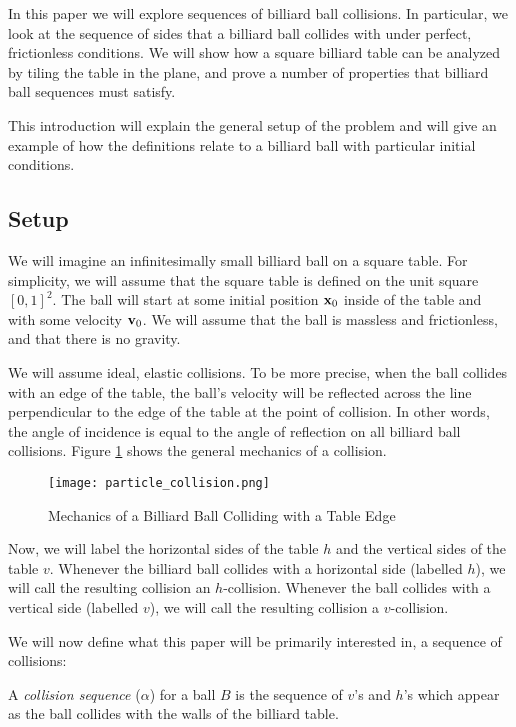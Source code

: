 In this paper we will explore sequences of billiard ball collisions. In particular, we look at the sequence of sides that a billiard ball collides with under perfect, frictionless conditions. We will show how a square billiard table can be analyzed by tiling the table in the plane, and prove a number of properties that billiard ball sequences must satisfy.

This introduction will explain the general setup of the problem and will give an example of how the definitions relate to a billiard ball with particular initial conditions.

\subsection{Setup}

We will imagine an infinitesimally small billiard ball on a square table. For simplicity, we will assume that the square table is defined on the unit square $[0,1]^2$. The ball will start at some initial position $\mathbf{x}_0$ inside of the table and with some velocity $\mathbf{v}_0$. We will assume that the ball is massless and frictionless, and that there is no gravity.

We will assume ideal, elastic collisions. To be more precise, when the ball collides with an edge of the table, the ball's velocity will be reflected across the line perpendicular to the edge of the table at the point of collision. In other words, the angle of incidence is equal to the angle of reflection on all billiard ball collisions. Figure \ref{fig:collision-angle} shows the general mechanics of a collision.

\begin{figure}
  \texttt{[image: particle\_collision.png]}
  \caption{\label{fig:collision-angle}Mechanics of a Billiard Ball Colliding with a Table Edge}
\end{figure}

Now, we will label the horizontal sides of the table $h$ and the vertical sides of the table $v$. Whenever the billiard ball collides with a horizontal side (labelled $h$), we will call the resulting collision an $h$-collision. Whenever the ball collides with a vertical side (labelled $v$), we will call the resulting collision a $v$-collision.

We will now define what this paper will be primarily interested in, a sequence of collisions:

\begin{definition}
  A \emph{collision sequence} ($\alpha$) for a ball $B$ is the sequence of $v$'s and $h$'s which appear as the ball collides with the walls of the billiard table.
\end{definition}

